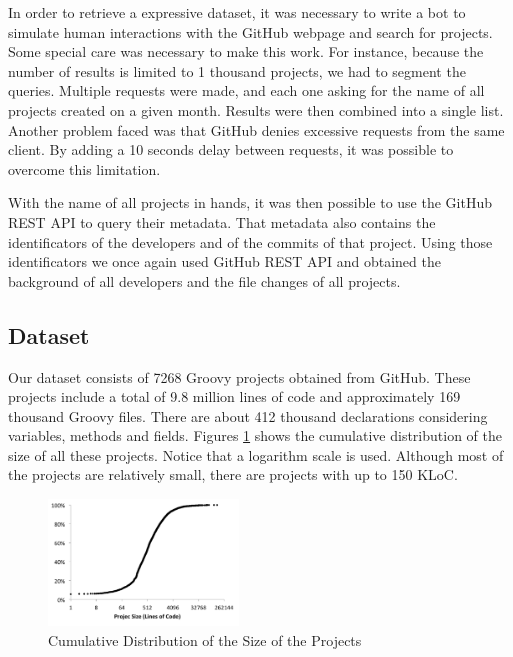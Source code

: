 \documentclass[preprint]{sigplanconf}
\begin{document}
In order to retrieve a expressive dataset, it was necessary to write a bot to simulate human interactions with the GitHub webpage and search for projects. 
Some special care was necessary to make this work. 
For instance, because the number of results is limited to 1 thousand projects, we had to segment the queries.
Multiple requests were made, and each one asking for the name of all projects created on a given month.
Results were then combined into a single list.
Another problem faced was that GitHub denies excessive requests from the same client.
By adding a 10 seconds delay between requests, it was possible to overcome this limitation.

With the name of all projects in hands, it was then possible to use the GitHub REST API to query their metadata.
That metadata also contains the identificators of the developers and of the commits of that project.
Using those identificators we once again used GitHub REST API and obtained the background of all developers and the file changes of all projects.


\subsection{Dataset\label{dataset}}


Our dataset consists of 7268 Groovy projects obtained from GitHub. 
These projects include a total of 9.8 million lines of code and approximately 169 thousand Groovy files. 
There are about 412 thousand declarations considering variables, methods and fields. 
Figures \ref{fig:size_distribution} shows the cumulative distribution of the size of all these projects.
Notice that a logarithm scale is used.
Although most of the projects are relatively small, there are projects with up to 150 KLoC. 



\begin{figure}[ht]
\centering \includegraphics[width=0.45\textwidth]{size_distribution}
\caption{Cumulative Distribution of the Size of the Projects}
\label{fig:size_distribution} 
\end{figure}
\end{document}
